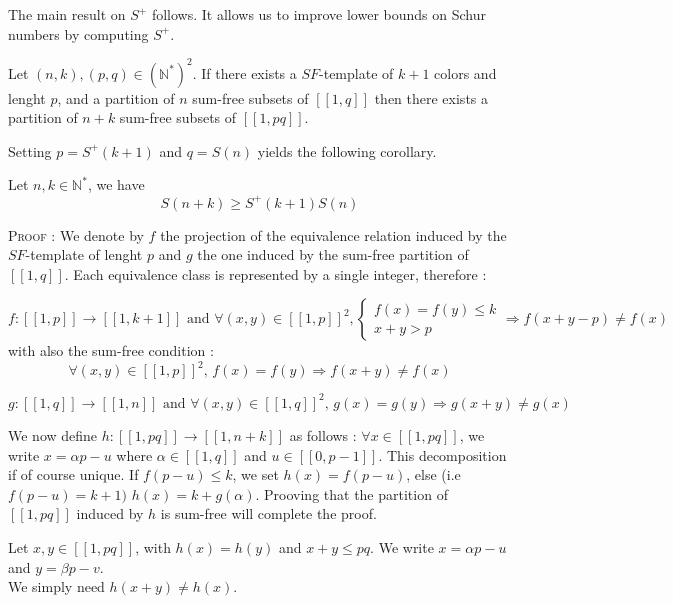 The main result on \(S^+\) follows. It allows us to improve lower bounds on Schur numbers by computing \(S^+\).

\begin{theorem}
	Let \((n,k), (p,q) \in (\mathbb{N}^*)^2\). If there exists a \(SF\)-template of \(k+1\) colors and lenght \(p\),
and a partition of \(n\) sum-free subsets of \([\![1,q]\!]\) then there exists a partition of \(n+k\) sum-free subsets
of \([\![1,pq]\!]\).
\end{theorem}

Setting \(p = S^+(k+1)\) and \(q = S(n)\) yields the following corollary.

\begin{corollary}
	Let \(n, k \in \mathbb{N}^*\), we have \\
	\[ S(n+k) \geqslant S^+(k+1)S(n) \]
\end{corollary}

\textsc{Proof :} We denote by \(f\) the projection of the equivalence relation induced by the \(SF\)-template of lenght \(p\) 
and \(g\) the one induced by the sum-free partition of \([\![1,q]\!]\). Each equivalence class is represented by a single integer, therefore :

\[ f : [\![1,p]\!] \longrightarrow [\![1,k+1]\!] \text{ and } \forall (x,y) \in [\![1,p]\!]^2, \left\{
\begin{array}{ll}
	f(x) = f(y) \leqslant k \\
	x + y > p
\end{array}
\right.
\Longrightarrow f(x+y-p) \neq f(x)
\]
with also the sum-free condition : \[ \forall (x,y) \in [\![1,p]\!]^2 \text{, } f(x) = f(y)
\Longrightarrow f(x+y) \neq f(x) \]

\[g : [\![1,q]\!] \longrightarrow [\![1,n]\!] \text{ and } \forall (x,y) \in [\![1,q]\!]^2 \text{, } g(x) = g(y)
\Longrightarrow g(x+y) \neq g(x)
\]

We now define \(h : [\![1,pq]\!] \longrightarrow [\![1,n+k]\!] \) as follows :
\( \forall x \in [\![1,pq]\!] \), we write \(x = \alpha p - u\) where \(\alpha \in [\![1,q]\!] \) and \( u \in [\![0,p-1]\!] \).
This decomposition if of course unique. If \(f(p-u) \leqslant k\), we set \(h(x) = f(p-u)\), else (i.e \(f(p-u) = k + 1) \) \(h(x) = k + g(\alpha) \). 
Prooving that the partition of \([\![1,pq]\!]\) induced by \(h\) is sum-free will complete the proof.

Let \(x,y \in [\![1,pq]\!]\), with \(h(x) = h(y)\) and \(x+y \leqslant pq\). We write \(x = \alpha p - u\) and \(y = \beta p - v\). \\
We simply need \(h(x+y) \neq h(x)\). \\

